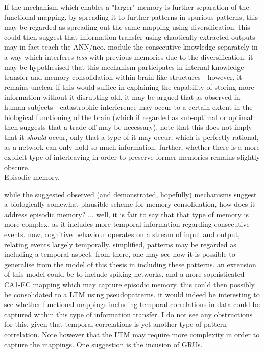 If the mechanism which enables a "larger" memory is further separation of the functional mapping, by spreading it to further patterns in spurious patterns, this may be regarded as spreading out the same mapping using diversification. this could then suggest that information transfer using chaotically extracted outputs may in fact teach the ANN/neo. module the consecutive knowledge separately in a way which interferes \textit{less} with previous memories due to the diversification.
it may be hypothesised that this mechanism participates in internal knowledge transfer and memory consolidation within brain-like structures - however, it remains unclear if this would suffice in explaining the capability of storing more information without it disrupting old. it may be argued that as observed in human subjects - catastrophic interference may occur to a certain extent in the biological functioning of the brain (which if regarded as sub-optimal or optimal then suggests that a trade-off may be necessary). note that this does not imply that it \textit{should} occur, only that a type of it may occur, which is perfectly rational, as a network can only hold so much information.
further, whether there is a more explicit type of interleaving in order to preserve former memories remains slightly obscure. 
\\

Episodic memory.

while the suggested observed (and demonstrated, hopefully) mechanisms suggest a biologically somewhat plausible scheme for memory consolidation, how does it address episodic memory?
... 
well, it is fair to say that that type of memory is more complex, as it includes more temporal information regarding consecutive events. now, cognitive behaviour operates on a stream of input and output, relating events largely temporally. simplified, patterns may be regarded as including a temporal aspect. from there, one may see how it is possible to generalise from the model of this thesis in including these patterns. 
an extension of this model could be to include spiking networks, and a more sophisticated CA1-EC mapping which may capture episodic memory. this could then possibly be consolidated to a LTM using pseudopatterns. it would indeed be interesting to see whether functional mappings including temporal correlations in data could be captured within this type of information transfer. I do not see any obstructions for this, given that temporal correlations is yet another type of pattern correlation. Note however that the LTM may require more complexity in order to capture the mappings. One suggestion is the incusion of GRUs.

